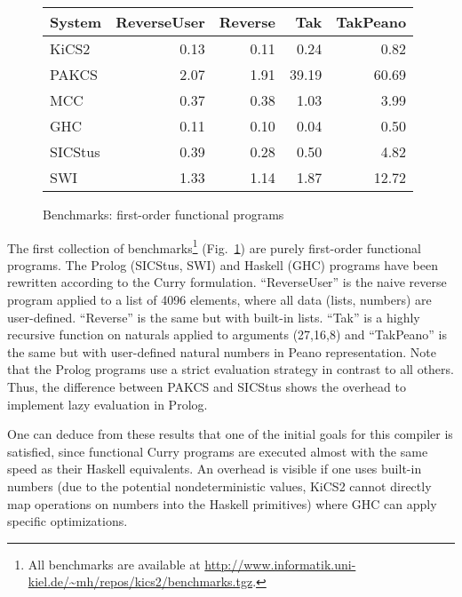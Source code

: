 \documentclass{llncs}
\begin{document}
\begin{figure}
\centering
\begin{tabular}{|@{~~}l@{~~}|*{4}{@{~~}r@{~~}|}}
\hline
System  & ReverseUser & Reverse &  Tak  & TakPeano \\\hline
KiCS2   &        0.13 &    0.11 &  0.24 &     0.82 \\
PAKCS   &        2.07 &    1.91 & 39.19 &    60.69 \\
MCC     &        0.37 &    0.38 &  1.03 &     3.99 \\
GHC     &        0.11 &    0.10 &  0.04 &     0.50 \\
SICStus &        0.39 &    0.28 &  0.50 &     4.82 \\
SWI     &        1.33 &    1.14 &  1.87 &    12.72 \\
\hline
\end{tabular}
\caption{Benchmarks: first-order functional programs}
 \label{fig:bench-first-order}
\end{figure}
%
The first collection of benchmarks\footnote{All benchmarks are available
at \url{http://www.informatik.uni-kiel.de/~mh/repos/kics2/benchmarks.tgz}.}
(Fig.~\ref{fig:bench-first-order})
are purely first-order functional programs.
The Prolog (SICStus, SWI) and Haskell (GHC) programs have been rewritten
according to the Curry formulation.
``ReverseUser'' is the naive reverse program applied to a list of 4096 elements,
where all data (lists, numbers) are user-defined.
``Reverse'' is the same but with built-in lists.
``Tak'' is a highly recursive function on naturals \cite{Partain93}
applied to arguments (27,16,8) and ``TakPeano'' is the same but with
user-defined natural numbers in Peano representation.
Note that the Prolog programs use a strict evaluation strategy
in contrast to all others. Thus, the difference between PAKCS and SICStus
shows the overhead to implement lazy evaluation in Prolog.

One can deduce from these results that one of the initial
goals for this compiler is satisfied, since functional Curry programs
are executed almost with the same speed as their Haskell equivalents.
An overhead is visible if one uses built-in numbers
(due to the potential nondeterministic values, KiCS2 cannot
directly map operations on numbers into the Haskell primitives)
where GHC can apply specific optimizations.
\end{document}

